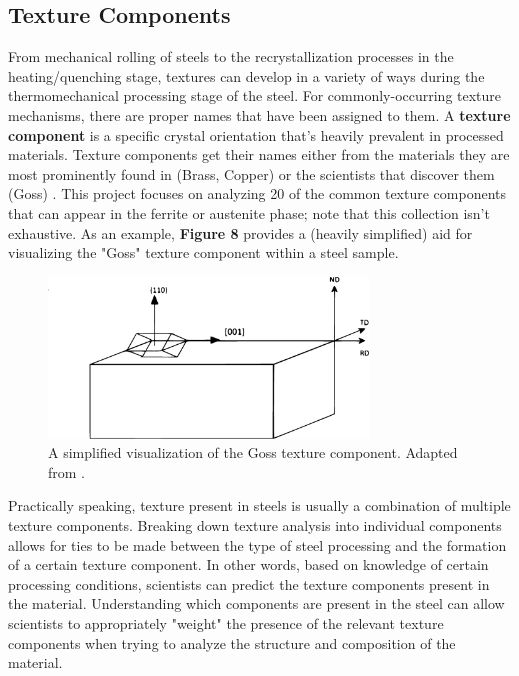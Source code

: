 \documentclass[10pt]{article}
\begin{document}
\subsection{Texture Components}
From mechanical rolling of steels to the recrystallization processes in the heating/quenching stage, textures can develop in a 
variety of ways during the thermomechanical processing stage of the steel. For commonly-occurring texture mechanisms, 
there are proper names that have been assigned to them. A \textbf{texture component} is a specific crystal orientation 
that’s heavily prevalent in processed materials. Texture components get their names either from the materials they are 
most prominently found in (Brass, Copper) or the scientists that discover them (Goss) \cite{ref08}. This project focuses on analyzing 20
of the common texture components that can appear in the ferrite or austenite phase; note that this collection isn't exhaustive. 
As an example, \textbf{Figure 8} provides a (heavily simplified) aid for visualizing the "Goss" texture component within a steel sample.
\begin{figure}[h]
    \centering
    \includegraphics[width=8.5cm]{fig8}
    \caption{\label{tab1}A simplified visualization of the Goss texture component. Adapted from \cite{ref08}.} 
    \end{figure}

Practically speaking, texture present in steels is usually a combination of multiple texture components. Breaking down texture analysis
into individual components allows for ties to be made between the type of steel processing and the formation of a certain texture 
component. In other words, based on knowledge of certain processing conditions, scientists can predict the texture components
present in the material. Understanding which components are present in the steel can allow scientists to appropriately
"weight" the presence of the relevant texture components when trying to analyze the structure and composition of the material.
 
\end{document}
